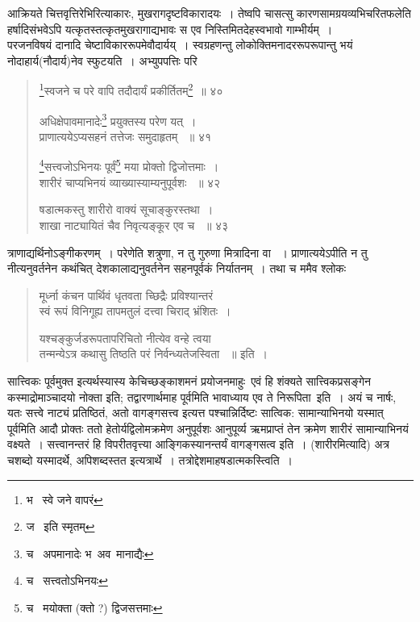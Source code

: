 \documentclass[11pt, openany]{book}
\begin{document}
आक्रियते चित्तवृत्तिरेभिरित्याकारः, मुखरागदृष्टविकारादयः~। तेष्वपि चासत्सु कारणसामग्रयव्यभिचरितफलेति हर्षादिसंभवेऽपि यत्कृतस्तत्कृतमुखरागाद्यभावः स एव निस्तिमितदेहस्वभावो गाम्भीर्यम्~।\\

परजनविषयं दानादि चेष्टाविकाररूपमेवौदार्यय्~। स्वग्रहणन्तु लोकोक्तिमनादररूपरूपान्तु भयं नोदाहार्य(नौदार्य)नेव स्फुटयति~। अभ्युपपत्तिः परि\textendash\ 

\newpage

\begin{quote}
 {\na \renewcommand{\thefootnote}{1}\footnote{भ \textendash\ स्वे जने वापरं}स्वजने च परे वापि तदौदार्यं प्रकीर्तितम्\renewcommand{\thefootnote}{2}\footnote{ज \textendash\ इति स्मृतम्}~॥ ४० 

अधिक्षेपावमानादेः\renewcommand{\thefootnote}{3}\footnote{च \textendash\ अपमानादेः भ\textendash\ अव\textendash\ मानाद्यैः} प्रयुक्तस्य परेण यत्~।\\ 
प्राणात्ययेऽप्यसहनं तत्तेजः समुदाहृतम् ~॥ ४१ 

\renewcommand{\thefootnote}{4}\footnote{च \textendash\ सत्त्वतोऽभिनयः}सत्त्वजोऽभिनयः पूर्वं\renewcommand{\thefootnote}{5}\footnote{च \textendash\ मयोक्ता (क्तो ?) द्विजसत्तमाः} मया प्रोक्तो द्विजोत्तमाः~। \\
शारीरं चाप्यभिनयं व्याख्यास्याम्यनुपूर्वशः ~॥ ४२ 

षडात्मकस्तु शारीरो वाक्यं सूचाङ्कुरस्तथा~।\\ 
शाखा नाट्यायितं चैव निवृत्यङ्कूर एव च ~॥ ४३ }
\end{quote}

\noindent
त्राणाद्यर्थिनोऽङ्गीकरणम्~। परेणेति शत्रुणा, न तु गुरुणा मित्रादिना वा ~। प्राणात्ययेऽपीति न तु नीत्यनुवर्तनेन कथंचित् देशकालाद्यनुवर्तनेन सहनपूर्वकं निर्यातनम्~। तथा च ममैव श्लोकः\textendash\ 

\begin{quote}
 {\qt मूर्ध्ना कंचन पार्थिवं धृतवता च्छिद्रैः प्रविश्यान्तरं \\
स्वं रूपं विनिगूह्य तापमतुलं दत्त्वा चिराद् भ्रंशितः~। 

यश्चङ्कुर्जडरूपतापरिचितो नीत्येव वन्हे त्वया\\ 
तन्मन्येऽत्र कथासु तिष्ठति परं निर्वन्ध्यतेजस्विता ~॥ इति~। }
\end{quote}

सात्त्विकः पूर्वमुक्त इत्यर्थस्यास्य केचिच्छङ्काशमनं प्रयोजनमाहुः\textendash\ एवं हि शंक्यते सात्त्विकप्रसङ्गेन कस्माद्रोमाञ्चादयो नोक्ता इति; तद्वारणार्थमाह पूर्वमिति भावाध्याय एव ते निरूपिता\textendash\ इति~। अयं च नार्षः, यतः सत्त्वे नाट्यं प्रतिष्ठितं, अतो वागङ्गसत्त्व इत्यत्त पश्चान्निर्दिष्टः सात्विक: सामान्याभिनयो यस्मात् पूर्वमिति आदौ प्रोक्तः ततो हेतोर्यद्विलोमक्रमेण अनुपूर्वशः आनुपूर्व्य ऋमप्राप्तं तेन क्रमेण शारीरं सामान्याभिनयं वक्ष्यते~। सत्त्वानन्तरं हि विपरीतवृत्त्या आङ्गिकस्यानन्तर्यं वागङ्गसत्व इति~। (शारीरमित्यादि) अत्र चशब्दो यस्मादर्थे, अपिशब्दस्तत इत्यत्रार्थे~। तत्रोद्देशमाहषडात्मकस्त्विति~।
\end{document}

